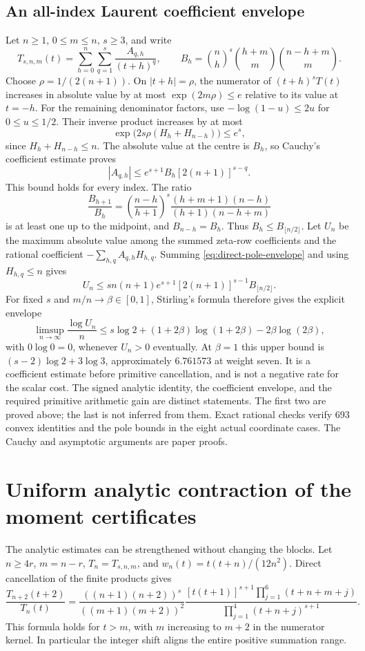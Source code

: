 \documentclass[11pt]{article}
\theoremstyle{remark}
\begin{document}
\subsection{An all-index Laurent coefficient envelope}
Let \(n\ge1\), \(0\le m\le n\), \(s\ge3\), and write
\[
 T_{s,n,m}(t)=\sum_{h=0}^n\sum_{q=1}^s\frac{A_{q,h}}{(t+h)^q},
 \qquad B_h=\binom nh^s\binom{h+m}m\binom{n-h+m}m.
\]
Choose \(\rho=1/(2(n+1))\). On \(|t+h|=\rho\), the numerator
of \((t+h)^sT(t)\) increases in absolute value by at most
\(\exp(2m\rho)\le e\) relative to its value at \(t=-h\).
For the remaining denominator factors, use
\(-\log(1-u)\le2u\) for \(0\le u\le1/2\). Their inverse
product increases by at most
\[
 \exp\bigl(2s\rho(H_h+H_{n-h})\bigr)\le e^s,
\]
since \(H_h+H_{n-h}\le n\). The absolute value at the centre is
\(B_h\), so Cauchy's coefficient estimate proves
\begin{equation}
 |A_{q,h}|\le e^{s+1}B_h[2(n+1)]^{s-q}.
 \label{eq:direct-pole-envelope}
\end{equation}
This bound holds for every index. The ratio
\[
 \frac{B_{h+1}}{B_h}
 =\left(\frac{n-h}{h+1}\right)^s
   \frac{(h+m+1)(n-h)}{(h+1)(n-h+m)}
\]
is at least one up to the midpoint, and \(B_{n-h}=B_h\).
Thus \(B_h\le B_{\lfloor n/2\rfloor}\).
Let \(U_n\) be the maximum absolute value among the summed zeta-row
coefficients and the rational coefficient
\(-\sum_{h,q}A_{q,h}H_{h,q}\). Summing
\eqref{eq:direct-pole-envelope} and using \(H_{h,q}\le n\) gives
\[
 U_n\le sn(n+1)e^{s+1}[2(n+1)]^{s-1}B_{\lfloor n/2\rfloor}.
\]
For fixed \(s\) and \(m/n\to\beta\in[0,1]\), Stirling's formula
therefore gives the explicit envelope
\begin{equation}
 \limsup_{n\to\infty}\frac{\log U_n}{n}
 \le s\log2+(1+2\beta)\log(1+2\beta)-2\beta\log(2\beta),
 \label{eq:direct-pole-rate}
\end{equation}
with \(0\log0=0\), whenever \(U_n>0\) eventually.
At \(\beta=1\) this upper bound is
\((s-2)\log2+3\log3\), approximately \(6.761573\) at weight seven.
It is a coefficient estimate before primitive cancellation, and is
not a negative rate for the scalar cost. The signed analytic identity,
the coefficient envelope, and the required primitive arithmetic gain
are distinct statements. The first two are proved above; the last is
not inferred from them. Exact rational checks verify 693 convex
identities and the pole bounds in the eight actual coordinate cases.
The Cauchy and asymptotic arguments are paper proofs.

\section{Uniform analytic contraction of the moment certificates}
The analytic estimates can be strengthened without changing the blocks.
Let \(n\ge4r\), \(m=n-r\), \(T_n=T_{s,n,m}\), and
\(w_n(t)=t(t+n)/(12n^2)\). Direct cancellation of the finite products gives
\[
 \frac{T_{n+2}(t+2)}{T_n(t)}=
 \frac{((n+1)(n+2))^s}{((m+1)(m+2))^2}
 \frac{[t(t+1)]^{s+1}\prod_{j=1}^6(t+n+m+j)}
 {\prod_{j=1}^4(t+n+j)^{s+1}}.
\]
This formula holds for \(t>m\), with \(m\) increasing to \(m+2\)
in the numerator kernel. In particular the integer shift aligns the
entire positive summation range.
\end{document}
